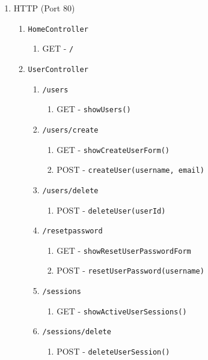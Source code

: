 \documentclass[12pt,DIV14,BCOR10mm,a4paper,twoside,parskip=half-,headsepline,headinclude,english,ngerman,bibliography=totocnumbered]{scrreprt}
\begin{document}
\begin{enumerate}
  \item HTTP (Port 80)
  \begin{enumerate}
    \item \texttt{HomeController}
    \begin{enumerate}
      \item GET - \texttt{/}
    \end{enumerate}

    \item \texttt{UserController}
    \begin{enumerate}
      \item \texttt{/users}
      \begin{enumerate}
        \item GET - \texttt{showUsers()}
      \end{enumerate}
      \item \texttt{/users/create}
      \begin{enumerate}
        \item GET - \texttt{showCreateUserForm()}
        \item POST - \texttt{createUser(username, email)}
      \end{enumerate}
      \item \texttt{/users/delete}
      \begin{enumerate}
        \item POST - \texttt{deleteUser(userId)}
      \end{enumerate}
      \item \texttt{/resetpassword}
      \begin{enumerate}
        \item GET - \texttt{showResetUserPasswordForm}
        \item POST - \texttt{resetUserPassword(username)}
      \end{enumerate}
      \item \texttt{/sessions}
      \begin{enumerate}
        \item GET - \texttt{showActiveUserSessions()}
      \end{enumerate}
      \item \texttt{/sessions/delete}
      \begin{enumerate}
        \item POST - \texttt{deleteUserSession()}
      \end{enumerate}
    \end{enumerate}


\end{enumerate}
\end{enumerate}
\end{document}
